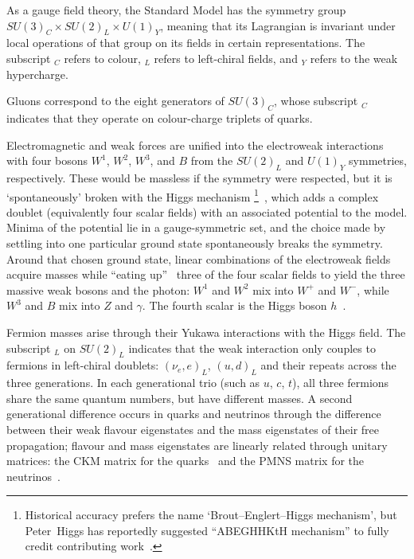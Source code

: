 As a gauge field theory, the Standard Model has the symmetry group
$SU\!(3)_C \times SU\!(2)_L \times U\!(1)_Y$,
meaning that its Lagrangian is invariant under local operations of that group
on its fields in certain representations.
The subscript $_C$ refers to colour, $_L$ refers to left-chiral fields, and
$_Y$ refers to the weak hypercharge.

Gluons correspond to the eight generators of $SU\!(3)_C$, whose
subscript $_C$ indicates that they operate on colour-charge triplets of quarks.

Electromagnetic and weak forces are unified into the electroweak
interactions with four bosons $W^1$, $W^2$, $W^3$, and $B$ from the
$SU\!(2)_L$ and $U\!(1)_Y$ symmetries, respectively.
These would be massless if the symmetry were respected, but it is
`spontaneously' broken with the Higgs mechanism
\footnote{%
Historical accuracy prefers the name `Brout–Englert–Higgs mechanism', but
Peter~Higgs has reportedly suggested ``ABEGHHKtH mechanism'' to fully credit
contributing work~\cite{close2011infinity}.%
}~\cite{
higgs1964broken,
englert1964broken
},
which adds a complex doublet (equivalently four scalar fields) with an
associated potential to the model.
Minima of the potential lie in a gauge-symmetric set, and the choice made by
settling into one particular ground state spontaneously breaks the symmetry.
Around that chosen ground state, linear combinations of the electroweak fields
acquire masses while ``eating up''~\cite{rubakov1999classical} three of the
four scalar fields to yield the three massive weak bosons and the photon:
$W^1$ and $W^2$ mix into $W^+$ and $W^-$, while $W^3$ and $B$ mix into $Z$ and
$\gamma$.
The fourth scalar is the Higgs boson $h$~\cite{
glashow1959renorm,
weinberg1967model,
salam1959weak,
rubakov1999classical,
cottingham2007greenwood
}.

Fermion masses arise through their Yukawa interactions with the Higgs field.
The subscript $_L$ on $SU\!(2)_L$ indicates that the weak interaction only
couples to fermions in left-chiral doublets: $(\nu_e, e)_L$,
$(u, d)_L$ and their repeats across the three generations.
In each generational trio (such as $u$, $c$, $t$), all three fermions share the
same quantum numbers, but have different masses.
A second generational difference occurs in quarks and neutrinos through the
difference between their weak flavour eigenstates and the mass eigenstates of
their free propagation;
flavour and mass eigenstates are linearly related through unitary matrices:
the CKM matrix for the quarks~\cite{
cabibbo1963unitary,
kabayasji1973cpv
}
and the PMNS matrix for the neutrinos~\cite{
maki1962remarks,
thomson2013modern
}.

